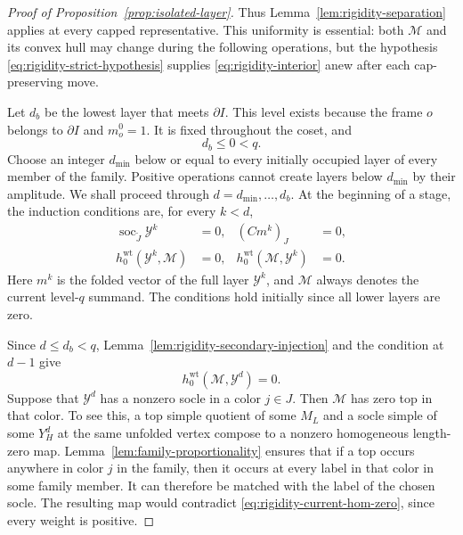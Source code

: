\begin{proof}[Proof of Proposition~\ref{prop:isolated-layer}]
Thus Lemma~\ref{lem:rigidity-separation} applies at every capped
representative.  This uniformity is essential: both $\mathcal M$ and its
convex hull may change during the following operations, but the
hypothesis \eqref{eq:rigidity-strict-hypothesis} supplies
\eqref{eq:rigidity-interior} anew after each cap-preserving move.

Let $d_b$ be the lowest layer that meets $\partial I$.  This level exists
because the frame $o$ belongs to $\partial I$ and $m_o^0=1$.  It is fixed
throughout the coset, and
\begin{equation}
 d_b\le0<q.
 \label{eq:rigidity-boundary-level}
\end{equation}
Choose an integer $d_{\min}$ below or equal to every initially occupied
layer of every member of the family.  Positive operations cannot create
layers below $d_{\min}$ by their amplitude.  We shall proceed through
$d=d_{\min},\ldots,d_b$.  At the beginning of a stage, the induction
conditions are, for every $k<d$,
\begin{equation}
 \begin{aligned}
 \operatorname{soc}_{\widetilde J}\mathcal Y^k&=0,
 & (Cm^k)_J&=0,\\
 h_0^{\mathrm{wt}}(\mathcal Y^k,\mathcal M)&=0,
 & h_0^{\mathrm{wt}}(\mathcal M,\mathcal Y^k)&=0.
 \end{aligned}
 \label{eq:rigidity-induction}
\end{equation}
Here $m^k$ is the folded vector of the full layer $\mathcal Y^k$, and
$\mathcal M$ always denotes the current level-$q$ summand.  The conditions
hold initially since all lower layers are zero.

Since $d\le d_b<q$, Lemma~\ref{lem:rigidity-secondary-injection} and the
condition at $d-1$ give
\begin{equation}
 h_0^{\mathrm{wt}}(\mathcal M,\mathcal Y^d)=0.
 \label{eq:rigidity-current-hom-zero}
\end{equation}
Suppose that $\mathcal Y^d$ has a nonzero socle in a color $j\in J$.
Then $\mathcal M$ has zero top in that color.  To see this, a top simple
quotient of some $M_L$ and a socle simple of some $Y_H^d$ at the same
unfolded vertex compose to a nonzero homogeneous length-zero map.
Lemma~\ref{lem:family-proportionality} ensures that if a top occurs
anywhere in color $j$ in the family, then it occurs at every label in
that color in some family member.  It can therefore be matched with the
label of the chosen socle.  The resulting map would contradict
\eqref{eq:rigidity-current-hom-zero}, since every weight is positive.


\end{proof}
